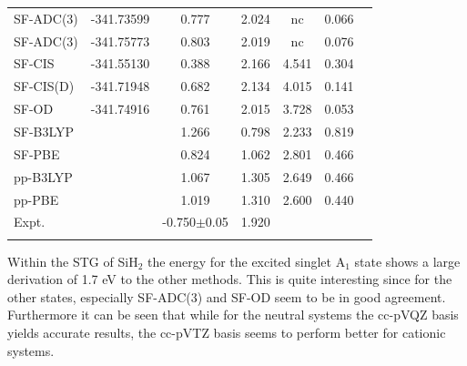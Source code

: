 \documentclass[aip,graphicx,amsmath,reprint]{revtex4-1}
\begin{document}
\begin{table}
\begin{ruledtabular}
\begin{tabular}{lcccccc}
\hline
SF-ADC(3)\footnotemark[1]&-341.73599&0.777&2.024&nc&0.066\\
SF-ADC(3)\footnotemark[2]&-341.75773&0.803&2.019&nc&0.076\\
SF-CIS\footnotemark[3]&-341.55130&0.388&2.166&4.541&0.304\\
SF-CIS(D)\footnotemark[3]&-341.71948&0.682&2.134&4.015&0.141\\
SF-OD\footnotemark[3]&-341.74916&0.761&2.015&3.728&0.053\\
SF-B3LYP\footnotemark[4]&&1.266&0.798&2.233&0.819\\
SF-PBE\footnotemark[4]&&0.824&1.062&2.801&0.466\\
pp-B3LYP\footnotemark[5]&&1.067&1.305&2.649&0.466\\
pp-PBE\footnotemark[5]&&1.019&1.310&2.600&0.440\\
Expt.&&-0.750$\pm$0.05\footnotemark[8]&1.920\footnotemark[8]&\\
&&&&&\\

\end{tabular}
\end{ruledtabular}
\end{table}



Within the STG of SiH$_2$ the energy for the excited singlet A$_1$ state shows a large derivation of 1.7 eV to the other methods. This is quite interesting since for the other states, especially SF-ADC(3) and SF-OD seem to be in good agreement. Furthermore it can be seen that while for the neutral systems the cc-pVQZ basis yields accurate results, the cc-pVTZ basis seems to perform better for cationic systems.
\end{document}
